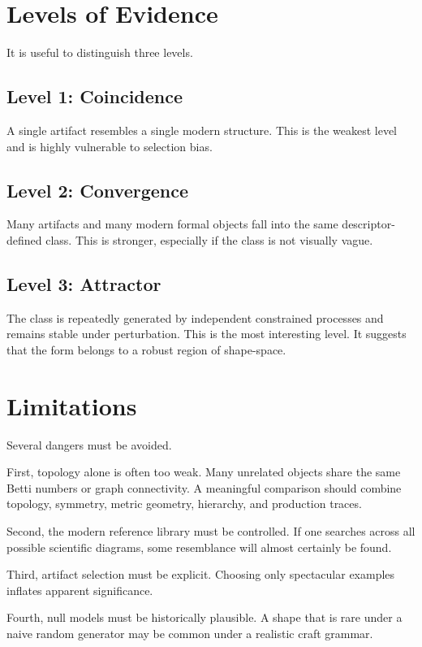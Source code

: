 \documentclass[11pt,a4paper]{article}
\begin{document}
\section{Levels of Evidence}

It is useful to distinguish three levels.

\subsection*{Level 1: Coincidence}
A single artifact resembles a single modern structure. This is the weakest level and is highly vulnerable to selection bias.

\subsection*{Level 2: Convergence}
Many artifacts and many modern formal objects fall into the same descriptor-defined class. This is stronger, especially if the class is not visually vague.

\subsection*{Level 3: Attractor}
The class is repeatedly generated by independent constrained processes and remains stable under perturbation. This is the most interesting level. It suggests that the form belongs to a robust region of shape-space.

\section{Limitations}

Several dangers must be avoided.

First, topology alone is often too weak. Many unrelated objects share the same Betti numbers or graph connectivity. A meaningful comparison should combine topology, symmetry, metric geometry, hierarchy, and production traces.

Second, the modern reference library must be controlled. If one searches across all possible scientific diagrams, some resemblance will almost certainly be found.

Third, artifact selection must be explicit. Choosing only spectacular examples inflates apparent significance.

Fourth, null models must be historically plausible. A shape that is rare under a naive random generator may be common under a realistic craft grammar.
\end{document}

